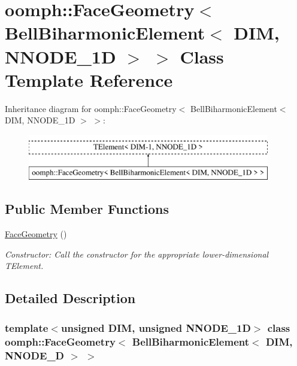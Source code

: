 \hypertarget{classoomph_1_1FaceGeometry_3_01BellBiharmonicElement_3_01DIM_00_01NNODE__1D_01_4_01_4}{}\section{oomph\+:\+:Face\+Geometry$<$ Bell\+Biharmonic\+Element$<$ D\+IM, N\+N\+O\+D\+E\+\_\+1D $>$ $>$ Class Template Reference}
\label{classoomph_1_1FaceGeometry_3_01BellBiharmonicElement_3_01DIM_00_01NNODE__1D_01_4_01_4}
Inheritance diagram for oomph\+:\+:Face\+Geometry$<$ Bell\+Biharmonic\+Element$<$ D\+IM, N\+N\+O\+D\+E\+\_\+1D $>$ $>$\+:\begin{figure}[H]
\begin{center}
\leavevmode
\includegraphics[height=2.000000cm]{classoomph_1_1FaceGeometry_3_01BellBiharmonicElement_3_01DIM_00_01NNODE__1D_01_4_01_4}
\end{center}
\end{figure}
\subsection*{Public Member Functions}
\begin{DoxyCompactItemize}
\item 
\hyperlink{classoomph_1_1FaceGeometry_3_01BellBiharmonicElement_3_01DIM_00_01NNODE__1D_01_4_01_4_a9242ac70d699ed140af2d89299b9cf19}{Face\+Geometry} ()
\begin{DoxyCompactList}\small\item\em Constructor\+: Call the constructor for the appropriate lower-\/dimensional T\+Element. \end{DoxyCompactList}\end{DoxyCompactItemize}


\subsection{Detailed Description}
\subsubsection*{template$<$unsigned D\+IM, unsigned N\+N\+O\+D\+E\+\_\+1D$>$\newline
class oomph\+::\+Face\+Geometry$<$ Bell\+Biharmonic\+Element$<$ D\+I\+M, N\+N\+O\+D\+E\+\_\+D $>$ $>$}

